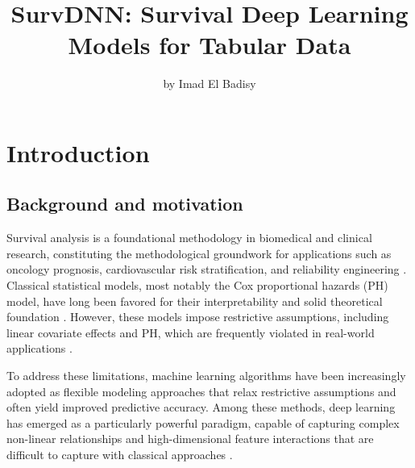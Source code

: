\title{SurvDNN: Survival Deep Learning Models for Tabular Data}


\author{by Imad El Badisy}

\maketitle


\section{Introduction}\label{introduction}

\subsection{Background and motivation}\label{background-and-motivation}

Survival analysis is a foundational methodology in biomedical and clinical research, constituting the methodological groundwork for applications such as oncology prognosis, cardiovascular risk stratification, and reliability engineering \citep{wiegrebe2024deep}. Classical statistical models, most notably the Cox proportional hazards (PH) model, have long been favored for their interpretability and solid theoretical foundation \citep{cox1972regression}. However, these models impose restrictive assumptions, including linear covariate effects and PH, which are frequently violated in real-world applications \citep{heagerty2005survival, batson2016review}.

To address these limitations, machine learning algorithms have been increasingly adopted as flexible modeling approaches that relax restrictive assumptions and often yield improved predictive accuracy. Among these methods, deep learning has emerged as a particularly powerful paradigm, capable of capturing complex non-linear relationships and high-dimensional feature interactions that are difficult to capture with classical approaches \citep{wiegrebe2024deep, bengio2021deep}.

